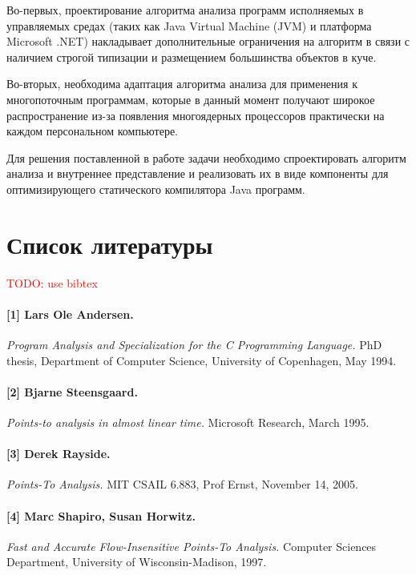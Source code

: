 \documentclass[a4,14pt,titlepage]{extarticle}
\newcommand{\todo}[1]{\textcolor{red}{TODO: #1}}
\newcommand{\eng}[1]{{\English#1}}
\begin{document}
    Во-первых,
    проектирование алгоритма анализа программ исполняемых в управляемых средах
    (таких как \eng{Java Virtual Machine (JVM)} и платформа
    \eng{Microsoft .NET}) накладывает дополнительные ограничения на алгоритм в
    связи с наличием строгой типизации и размещением большинства объектов в
    куче.

    Во-вторых, необходима адаптация алгоритма анализа
    для применения к многопоточным программам,
    которые в данный момент получают широкое распространение
    из-за появления многоядерных процессоров практически
    на каждом персональном компьютере.

    Для решения поставленной в работе задачи необходимо спроектировать алгоритм
    анализа и внутреннее представление и реализовать их в виде компоненты
    для оптимизирующего статического компилятора Java программ.


  \newpage
  \section{Список литературы}
    \todo{use bibtex}
    \paragraph{[1] Lars Ole Andersen.}
      \eng{
        \textit{Program Analysis and Specialization for
          the C Programming Language.}
        PhD thesis, Department of Computer Science, University of Copenhagen,
        May 1994.
      }

    \paragraph{[2] Bjarne Steensgaard.}
      \eng{
        \textit{Points-to analysis in almost linear time.}
        Microsoft Research,
        March 1995.
      }

    \paragraph{[3] Derek Rayside.}
      \eng{
        \textit{Points-To Analysis.}
        MIT CSAIL 6.883, Prof Ernst,
        November 14, 2005.
      }

    \paragraph{[4] Marc Shapiro, Susan Horwitz.}
      \eng{
        \textit{Fast and Accurate Flow-Insensitive Points-To Analysis.}
        Computer Sciences Department, University of Wisconsin-Madison,
        1997.
      }
\end{document}
